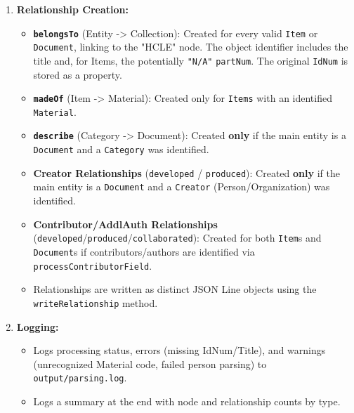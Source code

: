 \begin{enumerate}
    \item \textbf{Relationship Creation:}
        \begin{itemize}
            \item \textbf{\texttt{belongsTo}} (Entity -> Collection): Created for every valid \texttt{Item} or \texttt{Document}, linking to the "HCLE" node. The object identifier includes the title and, for Items, the potentially \texttt{"N/A"} \texttt{partNum}. The original \texttt{IdNum} is stored as a property.
            \item \textbf{\texttt{madeOf}} (Item -> Material): Created only for \texttt{Items} with an identified \texttt{Material}.
            \item \textbf{\texttt{describe}} (Category -> Document): Created \textbf{only} if the main entity is a \texttt{Document} and a \texttt{Category} was identified.
            \item \textbf{Creator Relationships} (\texttt{developed} / \texttt{produced}): Created \textbf{only} if the main entity is a \texttt{Document} and a \texttt{Creator} (Person/Organization) was identified.
            \item \textbf{Contributor/AddlAuth Relationships} (\texttt{developed}/\texttt{produced}/\texttt{collaborated}): Created for both \texttt{Item}s and \texttt{Document}s if contributors/authors are identified via \\
            \texttt{processContributorField}.
            \item Relationships are written as distinct JSON Line objects using the \texttt{writeRelationship} method.
        \end{itemize}

    \item \textbf{Logging:}
        \begin{itemize}
            \item Logs processing status, errors (missing IdNum/Title), and warnings (unrecognized Material code, failed person parsing) to \texttt{output/parsing.log}.
            \item Logs a summary at the end with node and relationship counts by type.
        \end{itemize}


\end{enumerate}

